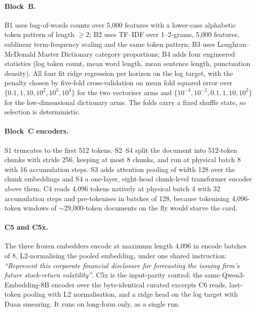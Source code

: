 \paragraph{Block~B.} B1 uses bag-of-words counts over 5{,}000 features with a
lower-case alphabetic token pattern of length $\geq 2$; B2 uses TF--IDF over
1--2-grams, 5{,}000 features, sublinear term-frequency scaling and the same token
pattern; B3 uses Loughran--McDonald Master Dictionary category proportions; B4
adds four engineered statistics (log token count, mean word length, mean sentence
length, punctuation density). %
All four fit ridge regression per horizon on the log target, with the penalty
chosen by five-fold cross-validation on mean fold squared error over
$\{0.1, 1, 10, 10^2, 10^3, 10^4\}$ for the two vectoriser arms and
$\{10^{-3}, 10^{-2}, 0.1, 1, 10, 10^2\}$ for the low-dimensional dictionary arms.
The folds carry a fixed shuffle state, so selection is deterministic. %

\paragraph{Block~C encoders.} S1 truncates to the first 512 tokens. S2--S4 split
the document into 512-token chunks with stride 256, keeping at most 8 chunks, and
run at physical batch 8 with 16 accumulation steps. S3 adds attention pooling of
width 128 over the chunk embeddings and S4 a one-layer, eight-head chunk-level
transformer encoder above them. %
C4 reads 4{,}096 tokens natively at physical batch 4 with 32 accumulation steps
and pre-tokenises in batches of 128, because tokenising 4{,}096-token windows of
$\sim$29{,}000-token documents on the fly would starve the card. %

\paragraph{C5 and C5x.} The three frozen embedders encode at maximum length
4{,}096 in encode batches of 8, L2-normalising the pooled embedding, under one
shared instruction: \emph{``Represent this corporate financial disclosure for
forecasting the issuing firm's future stock-return volatility''}. %
C5x is the input-parity control: the same Qwen3-Embedding-8B encoder over the
byte-identical curated excerpts C6 reads, last-token pooling with L2
normalisation, and a ridge head on the log target with Duan smearing. It runs on
long-form only, as a single run. %

